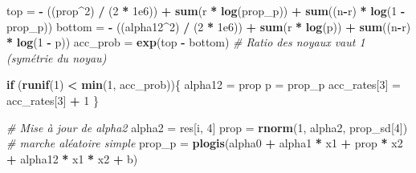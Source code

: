 \documentclass[
]{article}
\newenvironment{Shaded}{\begin{snugshade}}{\end{snugshade}}
\newcommand{\CommentTok}[1]{\textcolor[rgb]{0.56,0.35,0.01}{\textit{#1}}}
\newcommand{\ControlFlowTok}[1]{\textcolor[rgb]{0.13,0.29,0.53}{\textbf{#1}}}
\newcommand{\DecValTok}[1]{\textcolor[rgb]{0.00,0.00,0.81}{#1}}
\newcommand{\FloatTok}[1]{\textcolor[rgb]{0.00,0.00,0.81}{#1}}
\newcommand{\FunctionTok}[1]{\textcolor[rgb]{0.13,0.29,0.53}{\textbf{#1}}}
\newcommand{\NormalTok}[1]{#1}
\newcommand{\OtherTok}[1]{\textcolor[rgb]{0.56,0.35,0.01}{#1}}
\newcommand{\SpecialCharTok}[1]{\textcolor[rgb]{0.81,0.36,0.00}{\textbf{#1}}}
\begin{document}
\begin{Shaded}
\begin{Highlighting}[]
\NormalTok{    top }\OtherTok{=} \SpecialCharTok{{-}}\NormalTok{ ((prop}\SpecialCharTok{\^{}}\DecValTok{2}\NormalTok{) }\SpecialCharTok{/}\NormalTok{ (}\DecValTok{2} \SpecialCharTok{*} \FloatTok{1e6}\NormalTok{)) }\SpecialCharTok{+} \FunctionTok{sum}\NormalTok{(r }\SpecialCharTok{*} \FunctionTok{log}\NormalTok{(prop\_p)) }\SpecialCharTok{+} \FunctionTok{sum}\NormalTok{((n}\SpecialCharTok{{-}}\NormalTok{r) }\SpecialCharTok{*} \FunctionTok{log}\NormalTok{(}\DecValTok{1} \SpecialCharTok{{-}}\NormalTok{ prop\_p))}
\NormalTok{    bottom }\OtherTok{=} \SpecialCharTok{{-}}\NormalTok{ ((alpha12}\SpecialCharTok{\^{}}\DecValTok{2}\NormalTok{) }\SpecialCharTok{/}\NormalTok{ (}\DecValTok{2} \SpecialCharTok{*} \FloatTok{1e6}\NormalTok{)) }\SpecialCharTok{+} \FunctionTok{sum}\NormalTok{(r }\SpecialCharTok{*} \FunctionTok{log}\NormalTok{(p)) }\SpecialCharTok{+} \FunctionTok{sum}\NormalTok{((n}\SpecialCharTok{{-}}\NormalTok{r) }\SpecialCharTok{*} \FunctionTok{log}\NormalTok{(}\DecValTok{1} \SpecialCharTok{{-}}\NormalTok{ p))}
\NormalTok{    acc\_prob }\OtherTok{=} \FunctionTok{exp}\NormalTok{(top }\SpecialCharTok{{-}}\NormalTok{ bottom) }\CommentTok{\# Ratio des noyaux vaut 1 (symétrie du noyau)}
    
    \ControlFlowTok{if}\NormalTok{ (}\FunctionTok{runif}\NormalTok{(}\DecValTok{1}\NormalTok{) }\SpecialCharTok{\textless{}} \FunctionTok{min}\NormalTok{(}\DecValTok{1}\NormalTok{, acc\_prob))\{}
\NormalTok{      alpha12 }\OtherTok{=}\NormalTok{ prop}
\NormalTok{      p }\OtherTok{=}\NormalTok{ prop\_p}
\NormalTok{      acc\_rates[}\DecValTok{3}\NormalTok{] }\OtherTok{=}\NormalTok{ acc\_rates[}\DecValTok{3}\NormalTok{] }\SpecialCharTok{+} \DecValTok{1}
\NormalTok{    \}}
    
    \CommentTok{\# Mise à jour de alpha2}
\NormalTok{    alpha2 }\OtherTok{=}\NormalTok{ res[i, }\DecValTok{4}\NormalTok{]}
\NormalTok{    prop }\OtherTok{=} \FunctionTok{rnorm}\NormalTok{(}\DecValTok{1}\NormalTok{, alpha2, prop\_sd[}\DecValTok{4}\NormalTok{]) }\CommentTok{\# marche aléatoire simple}
\NormalTok{    prop\_p }\OtherTok{=} \FunctionTok{plogis}\NormalTok{(alpha0 }\SpecialCharTok{+}\NormalTok{ alpha1 }\SpecialCharTok{*}\NormalTok{ x1 }\SpecialCharTok{+}\NormalTok{ prop }\SpecialCharTok{*}\NormalTok{ x2 }\SpecialCharTok{+}\NormalTok{ alpha12 }\SpecialCharTok{*}\NormalTok{ x1 }\SpecialCharTok{*}\NormalTok{ x2 }\SpecialCharTok{+}\NormalTok{ b)}
    

\end{Highlighting}
\end{Shaded}
\end{document}
